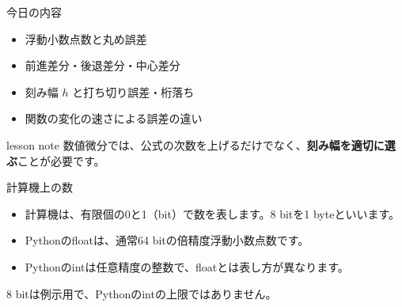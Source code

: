 \documentclass[12pt,aspectratio=43]{beamer}
\newcommand{\code}[1]{{\codefont #1}}
\newenvironment{lessonbox}
  {\begin{beamercolorbox}[wd=\linewidth,sep=1.5mm]{lesson note}}
  {\end{beamercolorbox}\par}
\begin{document}
\begin{frame}[t]{今日の内容}
  \begin{itemize}
    \setlength{\itemsep}{3mm}
    \item 浮動小数点数と丸め誤差
    \item 前進差分・後退差分・中心差分
    \item 刻み幅 $h$ と打ち切り誤差・桁落ち
    \item 関数の変化の速さによる誤差の違い
  \end{itemize}
  \vfill
  \begin{lessonbox}
    数値微分では、公式の次数を上げるだけでなく、\textbf{刻み幅を適切に選ぶ}ことが必要です。
  \end{lessonbox}
\end{frame}

\begin{frame}[t]{計算機上の数}
  \begin{itemize}
    \setlength{\itemsep}{1.5mm}
    \item 計算機は、有限個の0と1（bit）で数を表します。8 bitを1 byteといいます。
    \item Pythonの\code{float}は、通常64 bitの倍精度浮動小数点数です。
    \item Pythonの\code{int}は任意精度の整数で、\code{float}とは表し方が異なります。
  \end{itemize}
  \vspace{2mm}
  \begin{center}
  \end{center}
  \vfill
  {\small 8 bitは例示用で、Pythonの\code{int}の上限ではありません。}
\end{frame}
\end{document}
